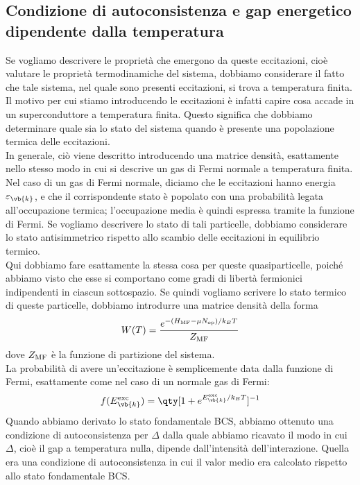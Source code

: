 \subsection{Condizione di autoconsistenza e gap energetico dipendente dalla temperatura}
Se vogliamo descrivere le proprietà che emergono da queste eccitazioni, cioè valutare le proprietà termodinamiche del sistema, dobbiamo considerare il fatto che tale sistema, nel quale sono presenti eccitazioni, si trova a temperatura finita. Il motivo per cui stiamo introducendo le eccitazioni è infatti capire cosa accade in un superconduttore a temperatura finita. Questo significa che dobbiamo determinare quale sia lo stato del sistema quando è presente una popolazione termica delle eccitazioni.\\
In generale, ciò viene descritto introducendo una matrice densità, esattamente nello stesso modo in cui si descrive un gas di Fermi normale a temperatura finita. Nel caso di un gas di Fermi normale, diciamo che le eccitazioni hanno energia $\varepsilon_{\vb{k}}$, e che il corrispondente stato è popolato con una probabilità legata all'occupazione termica; l'occupazione media è quindi espressa tramite la funzione di Fermi. Se vogliamo descrivere lo stato di tali particelle, dobbiamo considerare lo stato antisimmetrico rispetto allo scambio delle eccitazioni in equilibrio termico.\\
Qui dobbiamo fare esattamente la stessa cosa per queste quasiparticelle, poiché abbiamo visto che esse si comportano come gradi di libertà fermionici indipendenti in ciascun sottospazio. Se quindi vogliamo scrivere lo stato termico di queste particelle, dobbiamo introdurre una matrice densità della forma
\begin{equation*}
   W(T)
   =
   \frac{
      e^{-(H_{\rm MF}-\mu N_{\rm op})/k_B T}
   }{
      Z_{\rm MF}
   }
\end{equation*}
dove $Z_{\rm MF}$ è la funzione di partizione del sistema.\\
La probabilità di avere un'eccitazione è semplicemente data dalla funzione di Fermi, esattamente come nel caso di un normale gas di Fermi:
\begin{equation*}
   f(E^{\rm exc}_{\vb{k}})
   =
   \qty[
      1+
      e^{E^{\rm exc}_{\vb{k}}/k_B T}
   ]^{-1}
\end{equation*}
Quando abbiamo derivato lo stato fondamentale BCS, abbiamo ottenuto una condizione di autoconsistenza per $\Delta$ dalla quale abbiamo ricavato il modo in cui $\Delta$, cioè il gap a temperatura nulla, dipende dall'intensità dell'interazione. Quella era una condizione di autoconsistenza in cui il valor medio era calcolato rispetto allo stato fondamentale BCS.\\
